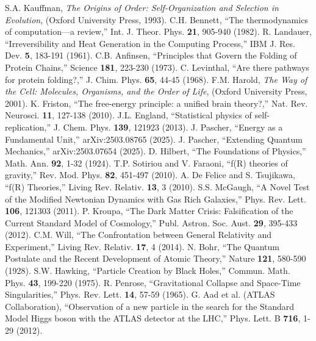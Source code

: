 \documentclass[twocolumn,aps,prl]{revtex4-2}
\begin{document}
\begin{thebibliography}{99}
		 S.A. Kauffman, \textit{The Origins of Order: Self-Organization and Selection in Evolution}, (Oxford University Press, 1993).
		 C.H. Bennett, ``The thermodynamics of computation—a review,'' Int. J. Theor. Phys. \textbf{21}, 905-940 (1982).
		 R. Landauer, ``Irreversibility and Heat Generation in the Computing Process,'' IBM J. Res. Dev. \textbf{5}, 183-191 (1961).
		 C.B. Anfinsen, ``Principles that Govern the Folding of Protein Chains,'' Science \textbf{181}, 223-230 (1973).
		 C. Levinthal, ``Are there pathways for protein folding?,'' J. Chim. Phys. \textbf{65}, 44-45 (1968).
		 F.M. Harold, \textit{The Way of the Cell: Molecules, Organisms, and the Order of Life}, (Oxford University Press, 2001).
		 K. Friston, ``The free-energy principle: a unified brain theory?,'' Nat. Rev. Neurosci. \textbf{11}, 127-138 (2010).
		 J.L. England, ``Statistical physics of self-replication,'' J. Chem. Phys. \textbf{139}, 121923 (2013).
		 J. Pascher, ``Energy as a Fundamental Unit,'' arXiv:2503.08765 (2025).
		 J. Pascher, ``Extending Quantum Mechanics,'' arXiv:2503.07654 (2025).
		 D. Hilbert, ``The Foundations of Physics,'' Math. Ann. \textbf{92}, 1-32 (1924).
		 T.P. Sotiriou and V. Faraoni, ``f(R) theories of gravity,'' Rev. Mod. Phys. \textbf{82}, 451-497 (2010).
		 A. De Felice and S. Tsujikawa, ``f(R) Theories,'' Living Rev. Relativ. \textbf{13}, 3 (2010).
		 S.S. McGaugh, ``A Novel Test of the Modified Newtonian Dynamics with Gas Rich Galaxies,'' Phys. Rev. Lett. \textbf{106}, 121303 (2011).
		 P. Kroupa, ``The Dark Matter Crisis: Falsification of the Current Standard Model of Cosmology,'' Publ. Astron. Soc. Aust. \textbf{29}, 395-433 (2012).
		 C.M. Will, ``The Confrontation between General Relativity and Experiment,'' Living Rev. Relativ. \textbf{17}, 4 (2014).
		 N. Bohr, ``The Quantum Postulate and the Recent Development of Atomic Theory,'' Nature \textbf{121}, 580-590 (1928).
		 S.W. Hawking, ``Particle Creation by Black Holes,'' Commun. Math. Phys. \textbf{43}, 199-220 (1975).
		 R. Penrose, ``Gravitational Collapse and Space-Time Singularities,'' Phys. Rev. Lett. \textbf{14}, 57-59 (1965).
		 G. Aad et al. (ATLAS Collaboration), ``Observation of a new particle in the search for the Standard Model Higgs boson with the ATLAS detector at the LHC,'' Phys. Lett. B \textbf{716}, 1-29 (2012).

\end{thebibliography}
\end{document}

